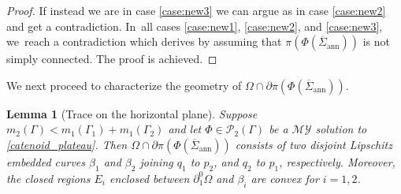 \documentclass[11pt]{article}
\numberwithin{equation}{section}
\let\Om\Omega
\newcommand{\immclosedann}{\Phi({\overline\Sigma}_\mathrm{ann})}
\newtheorem{lemma}[theorem]{Lemma}
\theoremstyle{definition}
\begin{document}
\begin{proof}
If instead we are in case \ref{case:new3} we can argue as in case \ref{case:new2} and get a contradiction. In~all cases \ref{case:new1}, \ref{case:new2}, and \ref{case:new3}, we~reach a contradiction which derives by assuming that $\pi(\immclosedann)$ is not simply connected. The proof is achieved.
\end{proof}

We next proceed to characterize the geometry of $\Om\cap\partial
\pi(\immclosedann)$.

\begin{lemma}[Trace on the horizontal plane]
\label{lem:trace_on_the_horizontal_plane}
Suppose $m_2(\Gamma)<m_1(\Gamma_1)+m_1(\Gamma_2)$ and let
$\Phi\in\mathcal{P}_2(\Gamma)$ be a $\mathcal{MY}$ solution to \eqref{catenoid_plateau}.
Then $\Om\cap\partial \pi(\immclosedann)$
consists of two disjoint Lipschitz
embedded curves $\beta_1$ and $\beta_2$ joining $q_1$ to $p_2$, and $q_2$ to $p_1$, respectively.
Moreover, the closed regions $E_i$
enclosed between $\partial^0_1\Om$ and $\beta_i$
are convex for $i=1,2$.
\end{lemma}
\end{document}
